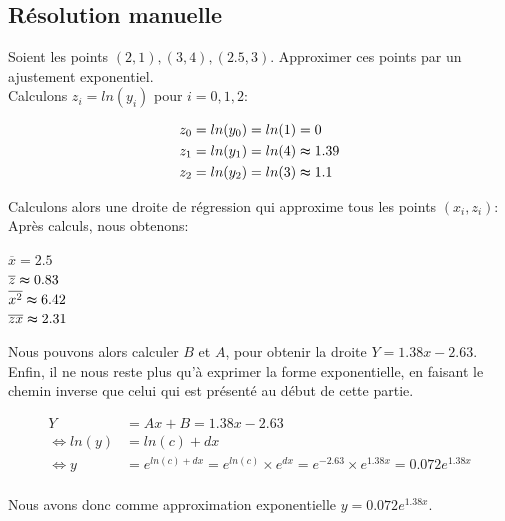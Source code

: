 \subsection{Résolution manuelle}
Soient les points $(2,1), (3,4), (2.5, 3)$. Approximer ces points par un ajustement exponentiel.\\
Calculons $z_i=ln(y_i)$ pour $i=0,1,2$:\\
\begin{center}
    \begin{align*}
        z_0&=ln(y_0)=ln(1)=0\\
        z_1&=ln(y_1)=ln(4)\thickapprox1.39\\
        z_2&=ln(y_2)=ln(3)\thickapprox 1.1\vspace{4pt}\\
    \end{align*}
\end{center}
Calculons alors une droite de régression qui approxime tous les points $(x_i, z_i)$:\\
Après calculs, nous obtenons: \\
\begin{center}
    $\overline{x}=2.5$\vspace{3pt}\\
    $\overline{z}\thickapprox0.83$\vspace{3pt}\\
    $\overline{x^2}\thickapprox6.42$\vspace{3pt}\\
    $\overline{zx}\thickapprox2.31$\vspace{3pt}\\
\end{center}
Nous pouvons alors calculer $B$ et $A$, pour obtenir la droite $Y=1.38x-2.63$.
Enfin, il ne nous reste plus qu'à exprimer la forme exponentielle, en faisant le chemin inverse que celui qui est présenté au début de cette partie.\\
\begin{center}
    \begin{align*}
        Y&=Ax+B=1.38x-2.63\\
        \Leftrightarrow ln(y)&=ln (c)+ dx \\
        \Leftrightarrow y&=e^{ln(c)+dx}=e^{ln(c)}\times e^{dx}=e^{-2.63}\times e^{1.38x}=0.072e^{1.38x}\\
    \end{align*}
\end{center}
Nous avons donc comme approximation exponentielle $y=0.072e^{1.38x}$.

